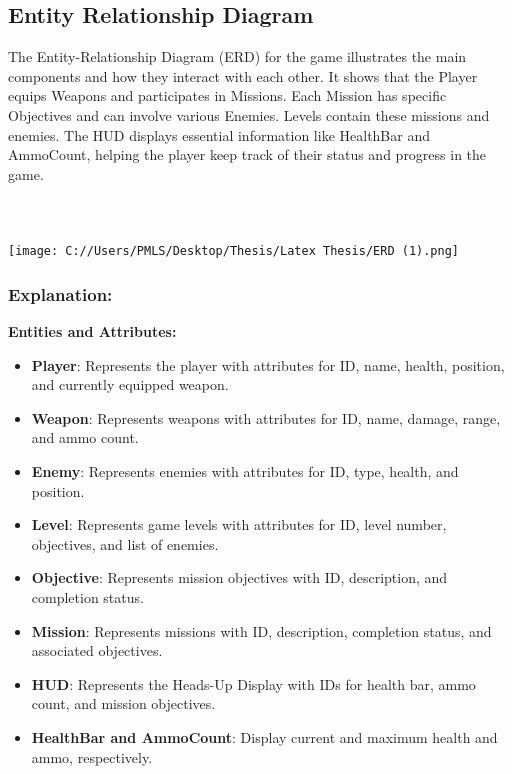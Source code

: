 \subsection{Entity Relationship Diagram}
The Entity-Relationship Diagram (ERD) for the game illustrates the main components and how they interact with each other. It shows that the Player equips Weapons and participates in Missions. Each Mission has specific Objectives and can involve various Enemies. Levels contain these missions and enemies. The HUD displays essential information like HealthBar and AmmoCount, helping the player keep track of their status and progress in the game.
\\
\\
\\
\\
\texttt{[image: C://Users/PMLS/Desktop/Thesis/Latex Thesis/ERD (1).png]}
\\

\subsubsection{Explanation:}

\textbf{Entities and Attributes:}

\begin{itemize}
	\item \textbf{Player}: Represents the player with attributes for ID, name, health, position, and currently equipped weapon.
	\item \textbf{Weapon}: Represents weapons with attributes for ID, name, damage, range, and ammo count.
	\item \textbf{Enemy}: Represents enemies with attributes for ID, type, health, and position.
	\item \textbf{Level}: Represents game levels with attributes for ID, level number, objectives, and list of enemies.
	\item \textbf{Objective}: Represents mission objectives with ID, description, and completion status.
	\item \textbf{Mission}: Represents missions with ID, description, completion status, and associated objectives.
	\item \textbf{HUD}: Represents the Heads-Up Display with IDs for health bar, ammo count, and mission objectives.
	\item \textbf{HealthBar and AmmoCount}: Display current and maximum health and ammo, respectively.
\end{itemize}


